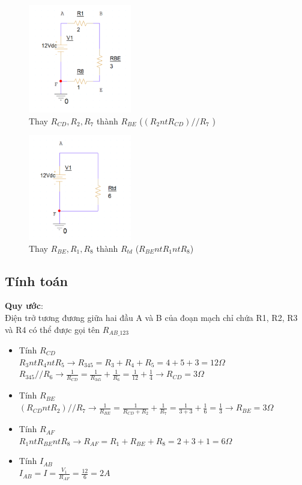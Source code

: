 \begin{figure}[!htbp]
    \centering
    \includegraphics[width=0.4\textwidth]{graphics/ex2/f5.png}
    \caption{Thay \(R_{CD}, R_2, R_7\) thành \(R_{BE}\) (\((R_2 nt R_{CD})// R_7\) )}
\end{figure}
\begin{figure}[!htbp]
    \centering
    \includegraphics[width=0.4\textwidth]{graphics/ex2/f3.png}
    \caption{Thay \(R_{BE}, R_1, R_8\) thành \(R_{td}\) (\(R_{BE} nt R_1 nt R_8\))}
\end{figure}

\newpage
\subsection{Tính toán}
\textbf{Quy ước}:\\
Điện trở tương đương giữa hai đầu A và B của đoạn mạch chỉ chứa R1, R2, R3 và R4 có thể được gọi tên \(R_{AB \_ 123}\)
\begin{itemize}
\item Tính \(R_{CD}\)\\\(R_3 nt R_4 nt R_5 \rightarrow R_{345} = R_3 + R_4 + R_5 = 4 + 5 + 3 = 12 \Omega\)\\ \(R_{345} // R_6 \rightarrow \frac{1}{R_{CD}} = \frac{1}{R_{345}} + \frac{1}{R_6} = \frac{1}{12} + \frac{1}{4} \rightarrow R_{CD} = 3 \Omega\)
\item Tính \(R_{BE}\)\\\((R_{CD} nt R_2)//R_7 \rightarrow \frac{1}{R_{BE}} = \frac{1}{R_{CD} + R_2} + \frac{1}{R_7} = \frac{1}{3 + 3} + \frac{1}{6} = \frac{1}{3} \rightarrow R_{BE} = 3 \Omega\)
\item Tính \(R_{AF}\)\\\(R_1 nt R_{BE} nt R_8 \rightarrow R_{AF} = R_1 + R_{BE} + R_8 = 2 + 3 + 1 = 6 \Omega\)
\item Tính \(I_{AB}\)\\\(I_{AB} = I = \frac{V_1}{R_{AF}} = \frac{12}{6} = 2 A\)
\end{itemize}


